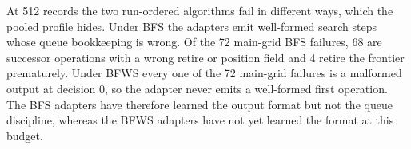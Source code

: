 At 512 records the two run-ordered algorithms fail in different ways, which the pooled profile hides. Under BFS the adapters emit well-formed search steps whose queue bookkeeping is wrong. Of the 72 main-grid BFS failures, 68 are successor operations with a wrong retire or position field and 4 retire the frontier prematurely. Under BFWS every one of the 72 main-grid failures is a malformed output at decision 0, so the adapter never emits a well-formed first operation. The BFS adapters have therefore learned the output format but not the queue discipline, whereas the BFWS adapters have not yet learned the format at this budget.




